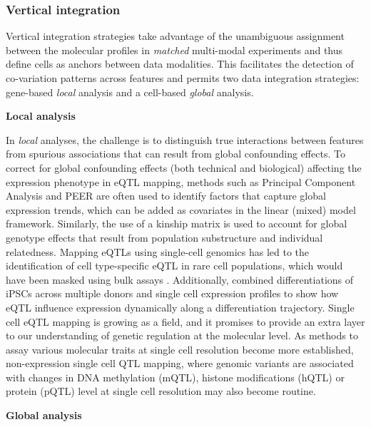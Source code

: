 \subsubsection{Vertical integration}

Vertical integration strategies take advantage of the unambiguous assignment between the molecular profiles in \textit{matched} multi-modal experiments and thus define cells as anchors between data modalities. This facilitates the detection of co-variation patterns across features and permits two data integration strategies: gene-based \textit{local} analysis and a cell-based \textit{global} analysis.

\textbf{Local analysis}

In \textit{local} analyses, the challenge is to distinguish true interactions between features from spurious associations that can result from global confounding effects. To correct for global confounding effects (both technical and biological) affecting the expression phenotype in eQTL mapping, methods such as Principal Component Analysis and PEER \cite{Stegle2010} are often used to identify factors that capture global expression trends, which can be added as covariates in the linear (mixed) model framework. Similarly, the use of a kinship matrix is used to account for global genotype effects that result from population substructure and individual relatedness. Mapping eQTLs using single-cell genomics has led to the identification of cell type-specific eQTL in rare cell populations, which would have been masked using bulk assays \cite{VanDerWijst2018}. Additionally, \cite{Cuomo2020} combined differentiations of iPSCs across multiple donors and single cell expression profiles to show how eQTL influence expression dynamically along a differentiation trajectory. Single cell eQTL mapping is growing as a field, and it promises to provide an extra layer to our understanding of genetic regulation at the molecular level. As methods to assay various molecular traits at single cell resolution become more established, non-expression single cell QTL mapping, where genomic variants are associated with changes in DNA methylation (mQTL), histone modifications (hQTL) or protein (pQTL) level at single cell resolution may also become routine.

\textbf{Global analysis}


